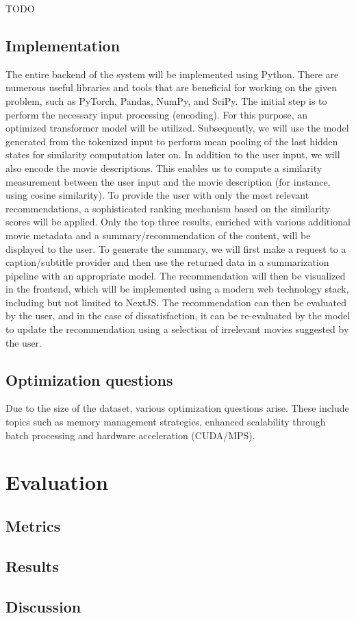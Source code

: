 \documentclass[11pt,a4paper]{article}
\begin{document}
  TODO

  \subsection{Implementation}

  The entire backend of the system will be implemented using Python.
  There are numerous useful libraries and tools that are beneficial for working on the given problem, such as PyTorch, Pandas, NumPy, and SciPy.
  The initial step is to perform the necessary input processing (encoding).
  For this purpose, an optimized transformer model will be utilized.
  Subsequently, we will use the model generated from the tokenized input to perform mean pooling of the last hidden states for similarity computation later on.
  In addition to the user input, we will also encode the movie descriptions.
  This enables us to compute a similarity measurement between the user input and the movie description (for instance, using cosine similarity).
  To provide the user with only the most relevant recommendations, a sophisticated ranking mechanism based on the similarity scores will be applied.
  Only the top three results, enriched with various additional movie metadata and a summary/recommendation of the content, will be displayed to the user.
  To generate the summary, we will first make a request to a caption/subtitle provider and then use the returned data in a summarization pipeline with an appropriate model.
  The recommendation will then be visualized in the frontend, which will be implemented using a modern web technology stack, including but not limited to NextJS.
  The recommendation can then be evaluated by the user, and in the case of dissatisfaction, it can be re-evaluated by the model to update the recommendation using a selection of irrelevant movies suggested by the user.

  \subsection{Optimization questions}
  Due to the size of the dataset, various optimization questions arise.
  These include topics such as memory management strategies, enhanced scalability through batch processing and hardware acceleration (CUDA/MPS).

  \section{Evaluation}
  \subsection{Metrics}

  \subsection{Results}

  \subsection{Discussion}
\end{document}
